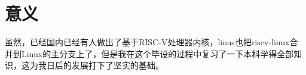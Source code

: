 \section{意义}
虽然，已经国内已经有人做出了基于RISC-V处理器内核，linus也把riscv-linux合并到Linux的主分支上了，但是我在这个毕设的过程中复习了一下本科学得全部知识，这为我日后的发展打下了坚实的基础。


